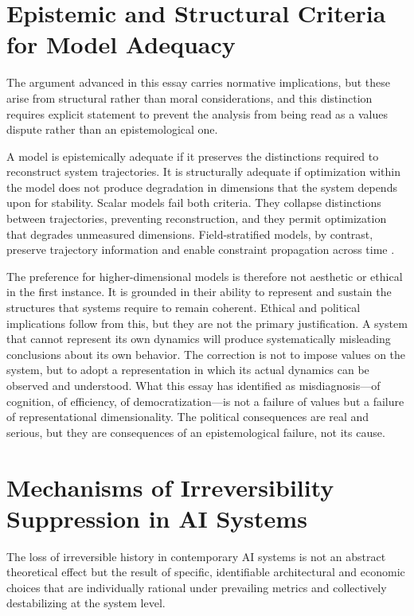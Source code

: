 \documentclass[12pt, a4paper]{article}
\begin{document}
\section{Epistemic and Structural Criteria for Model Adequacy}

The argument advanced in this essay carries normative implications, but these arise from structural rather than moral considerations, and this distinction requires explicit statement to prevent the analysis from being read as a values dispute rather than an epistemological one.

A model is epistemically adequate if it preserves the distinctions required to reconstruct system trajectories. It is structurally adequate if optimization within the model does not produce degradation in dimensions that the system depends upon for stability. Scalar models fail both criteria. They collapse distinctions between trajectories, preventing reconstruction, and they permit optimization that degrades unmeasured dimensions. Field-stratified models, by contrast, preserve trajectory information and enable constraint propagation across time \cite{Friston2010,Wiener1948}.

The preference for higher-dimensional models is therefore not aesthetic or ethical in the first instance. It is grounded in their ability to represent and sustain the structures that systems require to remain coherent. Ethical and political implications follow from this, but they are not the primary justification. A system that cannot represent its own dynamics will produce systematically misleading conclusions about its own behavior. The correction is not to impose values on the system, but to adopt a representation in which its actual dynamics can be observed and understood. What this essay has identified as misdiagnosis---of cognition, of efficiency, of democratization---is not a failure of values but a failure of representational dimensionality. The political consequences are real and serious, but they are consequences of an epistemological failure, not its cause.

\section{Mechanisms of Irreversibility Suppression in AI Systems}

The loss of irreversible history in contemporary AI systems is not an abstract theoretical effect but the result of specific, identifiable architectural and economic choices that are individually rational under prevailing metrics and collectively destabilizing at the system level.
\end{document}
